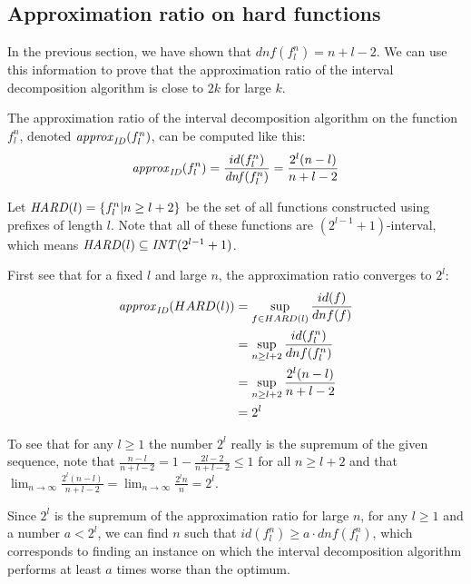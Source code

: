 \subsection{Approximation ratio on hard functions}

In the previous section,
we have shown that $dnf(f_l^n) = n+l-2$.
We can use this information to prove
that the approximation ratio
of the interval decomposition algorithm is close to $2k$
for large $k$.

The approximation ratio
of the interval decomposition algorithm
on the function $f_l^n$,
denoted $\mathit{approx}_{\mathit{ID}} (f_l^n)$,
can be computed like this:
$$
\mathit{approx}_{\mathit{ID}} (f_l^n)
= \frac{id(f_l^n)}{\mathit{dnf}(f_l^n)}
= \frac{2^l(n-l)}{n+l-2}
$$

Let $\mathit{HARD}(l) = \{f_l^n | n \geq l + 2\}$
be the set of all  functions constructed using
 prefixes of length $l$.
Note that all of these functions
are $(2^{l-1}+1)$-interval,
which means
$\mathit{HARD}(l) \subseteq \mathit{INT} (2^{l-1}+1)$.

First see that for a fixed $l$ and large $n$,
the approximation ratio converges to $2^l$:
\begin{align*}
\mathit{approx}_{\mathit{ID}} (HARD(l))
&= \sup_{f \in HARD(l)}{\frac{id(f)}{dnf(f)}} \\
&= \sup_{n \geq l+2}{\frac{id(f_l^n)}{dnf(f_l^n)}} \\
&= \sup_{n \geq l+2}{\frac{2^l(n-l)}{n+l-2}} \\
&= 2^l
\end{align*}

To see that for any $l \geq 1$
the number $2^l$ really is the supremum of the given sequence,
note that $\frac{n-l}{n+l-2}
= 1 - \frac{2l-2}{n+l-2} \leq 1$
for all $n \geq l+2$
and that
$\lim_{n \rightarrow \infty}{\frac{2^l(n-l)}{n+l-2}}
= \lim_{n \rightarrow \infty}{\frac{2^l n}{n}}
= 2^l$.

Since $2^l$ is the supremum of the approximation ratio
for large $n$,
for any $l \geq 1$ and a number $a < 2^l$,
we can find $n$ such that
$id(f_l^n) \geq a \cdot \mathit{dnf}(f_l^n)$,
which corresponds to finding an instance
on which the interval decomposition algorithm performs
at least $a$ times worse than the optimum.

